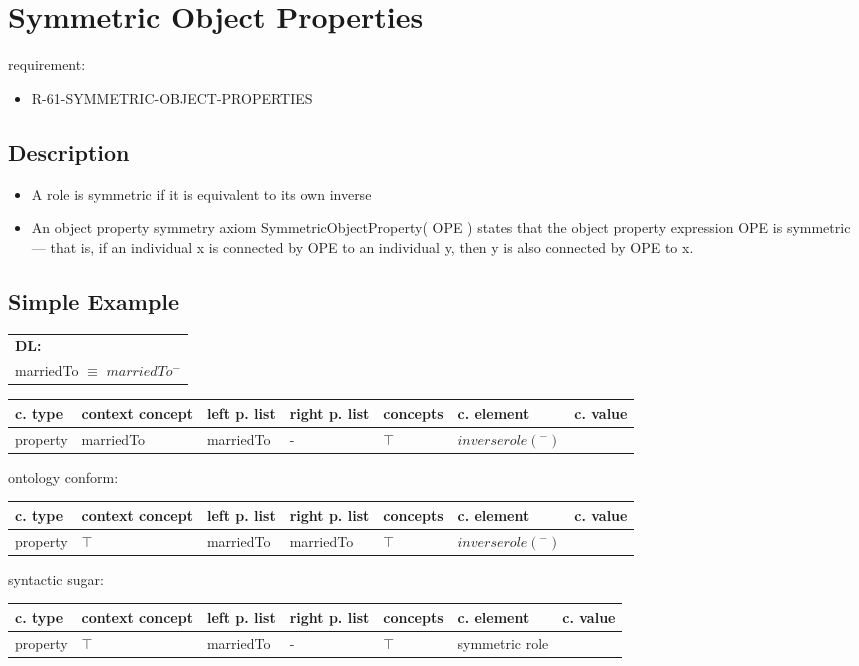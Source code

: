 \documentclass{llncs}
\newenvironment{gcotable}{
  \scriptsize
  \sffamily
  \vspace{0.3cm}
  \begin{tabular}{l|l|l|l|l|l|l}
  \hline
  \textbf{c. type} & \textbf{context concept} & \textbf{left p. list} & \textbf{right p. list} & \textbf{concepts} & \textbf{c. element} & \textbf{c. value} \\
  \hline

}{
  \hline
  \end{tabular}
  \linebreak
}
\newenvironment{DL}{
  \scriptsize
  \sffamily
  \vspace{0.3cm}
  \begin{tabular}{l}
	\textbf{DL:} \\

}{
  \end{tabular}
  \linebreak
}
\begin{document}
\section{Symmetric Object Properties}

requirement:

\begin{itemize}
	\item R-61-SYMMETRIC-OBJECT-PROPERTIES
\end{itemize}

\subsection{Description}

\begin{itemize}
	\item A role is symmetric if it is equivalent to its own inverse \cite{Kroetzsch2012}
  \item An object property symmetry axiom SymmetricObjectProperty( OPE ) states that the object property expression OPE is symmetric — that is, if an individual x is connected by OPE to an individual y, then y is also connected by OPE to x. 	
\end{itemize}

\subsection{Simple Example}

\begin{DL}
marriedTo $\equiv$ $marriedTo^{-}$ \\
\end{DL}

\begin{gcotable}
property & marriedTo & marriedTo & - & $\top$ & $inverse role (^{-})$ \\
\end{gcotable}

ontology conform:

\begin{gcotable}
property & $\top$ & marriedTo & marriedTo & $\top$ & $inverse role (^{-})$ \\
\end{gcotable}

syntactic sugar:

\begin{gcotable}
property & $\top$ & marriedTo & - & $\top$ & symmetric role \\
\end{gcotable}
\end{document}
